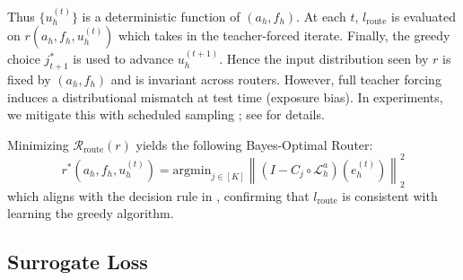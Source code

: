 \documentclass{article} %
\begin{document}
Thus $\{u^{(t)}_h\}$ is a deterministic function of $(a_h, f_h)$. At each $t$, $l_{\text{route}}$ is evaluated on $r(a_h, f_h, u^{(t)}_h)$ which takes in the teacher-forced iterate.
Finally, the greedy choice $j^*_{t + 1}$ is used to advance $u^{(t + 1)}_h$. Hence the input distribution seen by $r$ is fixed by $(a_h, f_h)$ and is invariant across routers.
However, full teacher forcing induces a distributional mismatch at test time (exposure bias). In experiments, we mitigate this with scheduled sampling \citep{bengio2015scheduled}; see  for details.


Minimizing $\mathcal{R}_{\text{route}}\left(r\right)$ yields the following Bayes-Optimal Router:
\begin{equation}\label{eq:bayesoptimalrouter}
    r^*(a_h, f_h, u^{(t)}_h) = \text{argmin}_{j \in [K]} \left\|\left( I - C_{j} \circ \mathcal{L}_{h}^a\right)\left(e^{(t)}_h\right)\right\|^2_2
\end{equation} 
which aligns with the decision rule in , confirming that $l_{\text{route}}$ is consistent with learning the greedy algorithm.

\subsection{Surrogate Loss}
\end{document}
